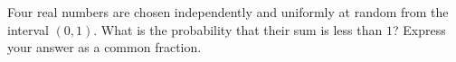 Four real numbers are chosen independently and uniformly at random from the interval $(0,1)$. What is the probability that their sum is less than $1$? Express your answer as a common fraction.
